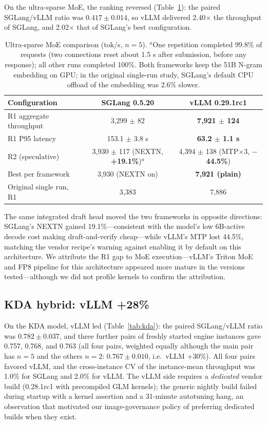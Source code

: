 \documentclass[11pt]{article}
\newcommand{\tps}{tok/s\xspace}
\begin{document}
On the ultra-sparse MoE, the ranking reversed (Table~\ref{tab:moe}): the paired SGLang/vLLM ratio was $0.417 \pm 0.014$, so vLLM delivered 2.40$\times$ the throughput of SGLang, and 2.02$\times$ that of SGLang's best configuration.

\begin{table}[t]
\centering
\small
\begin{tabular}{lcc}
\toprule
\textbf{Configuration} & \textbf{SGLang 0.5.20} & \textbf{vLLM 0.29.1rc1} \\
\midrule
R1 aggregate throughput & 3,299 $\pm$ 82 & \textbf{7,921 $\pm$ 124} \\
R1 P95 latency & 153.1 $\pm$ 3.8 s & \textbf{63.2 $\pm$ 1.1 s} \\
R2 (speculative) & 3,930 $\pm$ 117 (NEXTN, \textbf{+19.1\%})$^{a}$ & 4,394 $\pm$ 138 (MTP$\times$3, \textbf{$-$44.5\%}) \\
Best per framework & 3,930 (NEXTN on) & \textbf{7,921 (plain)} \\
Original single run, R1 & 3,383 & 7,886 \\
\bottomrule
\end{tabular}
\caption{Ultra-sparse MoE comparison (\tps, $n=5$). $^{a}$One repetition completed 99.8\% of requests (two connections reset about 1.5 s after submission, before any response); all other runs completed 100\%. Both frameworks keep the 51B N-gram embedding on GPU; in the original single-run study, SGLang's default CPU offload of the embedding was 2.6\% slower.}
\label{tab:moe}
\end{table}

The same integrated draft head moved the two frameworks in opposite directions: SGLang's NEXTN gained 19.1\%---consistent with the model's low 6B-active decode cost making draft-and-verify cheap---while vLLM's MTP lost 44.5\%, matching the vendor recipe's warning against enabling it by default on this architecture. We attribute the R1 gap to MoE execution---vLLM's Triton MoE and FP8 pipeline for this architecture appeared more mature in the versions tested---although we did not profile kernels to confirm the attribution.

\subsection{KDA hybrid: vLLM +28\%}
\label{sec:kda}

On the KDA model, vLLM led (Table~\ref{tab:kda}): the paired SGLang/vLLM ratio was $0.782 \pm 0.037$, and three further pairs of freshly started engine instances gave 0.757, 0.768, and 0.763 (all four pairs, weighted equally although the main pair has $n=5$ and the others $n=2$: $0.767 \pm 0.010$, i.e.\ vLLM +30\%). All four pairs favored vLLM, and the cross-instance CV of the instance-mean throughput was 1.0\% for SGLang and 2.0\% for vLLM. The vLLM side requires a \emph{dedicated} vendor build (0.28.1rc1 with precompiled GLM kernels); the generic nightly build failed during startup with a kernel assertion and a 31-minute autotuning hang, an observation that motivated our image-governance policy of preferring dedicated builds when they exist.
\end{document}
